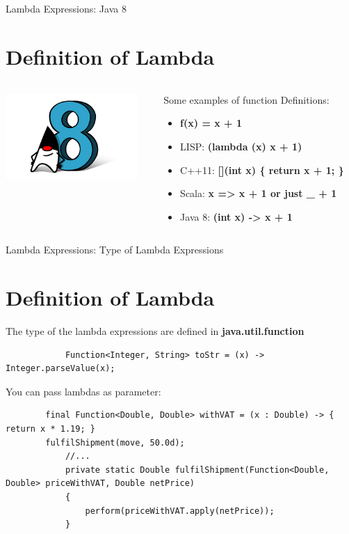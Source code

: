 \documentclass{beamer}
\begin{document}
	
	\begin{frame}{Lambda Expressions: Java 8}
	\section{Definition of Lambda}
	\begin{columns}
    	\begin{column}{0.3\textwidth}
			\centering
			\includegraphics[width=5cm]{duke8}	
    	\end{column}
    	\begin{column}{0.7\textwidth}
			Some examples of function Definitions:
			\begin{itemize}
				\item \textbf{f(x) = x + 1} 
				\item LISP: \textbf{(lambda (x) x + 1)}
				\item C++11: \textbf{[](int x) \{ return x + 1; \} }
				\item Scala: \textbf{x => x + 1 or just \_ + 1}
				\item Java 8: \textbf{(int x) -> x + 1}
				\end{itemize}
  		\end{column}
	\end{columns}
	\end{frame}	

	\begin{frame}[fragile]{Lambda Expressions: Type of Lambda Expressions}
		\section{Definition of Lambda}
		The type of the lambda expressions are defined in \textbf{java.util.function}
		\begin{lstlisting}
			Function<Integer, String> toStr = (x) -> Integer.parseValue(x);

		\end{lstlisting}
		
		You can pass lambdas as parameter:
		
		\begin{lstlisting}
		final Function<Double, Double> withVAT = (x : Double) -> { return x * 1.19; }
		fulfilShipment(move, 50.0d);
			//...
			private static Double fulfilShipment(Function<Double, Double> priceWithVAT, Double netPrice)
			{
			    perform(priceWithVAT.apply(netPrice));
			}
			
		\end{lstlisting}
	\end{frame}	
	
\end{document}
